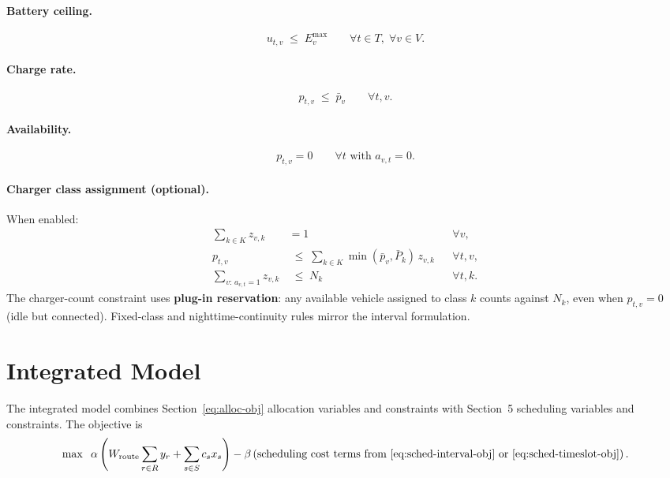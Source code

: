 \documentclass[11pt,a4paper]{article}
\newcommand{\1}{\mathbf{1}}
\begin{document}
\paragraph{Battery ceiling.}
\begin{equation}
  u_{t,v} \;\le\; E_v^{\max} \qquad \forall t \in T,\; \forall v \in V.
\end{equation}

\paragraph{Charge rate.}
\begin{equation}
  p_{t,v} \;\le\; \bar{p}_v \qquad \forall t,v.
\end{equation}

\paragraph{Availability.}
\begin{equation}
  p_{t,v} = 0 \qquad \forall t \text{ with } a_{v,t} = 0.
\end{equation}

\paragraph{Charger class assignment (optional).}
When enabled:
\begin{align}
  \sum_{k \in K} z_{v,k} &= 1 && \forall v, \\
  p_{t,v} &\;\le\; \sum_{k \in K} \min(\bar{p}_v, \bar{P}_k)\, z_{v,k} && \forall t,v, \\
  \sum_{v:\, a_{v,t}=1} z_{v,k} &\;\le\; N_k && \forall t,k.
\end{align}
The charger-count constraint uses \textbf{plug-in reservation}: any available vehicle
assigned to class $k$ counts against $N_k$, even when $p_{t,v} = 0$ (idle but connected).
Fixed-class and nighttime-continuity rules mirror the interval formulation.

\section{Integrated Model}

The integrated model combines Section~\ref{eq:alloc-obj} allocation variables and
constraints with Section~5 scheduling variables and constraints. The objective is
\begin{equation}
  \max \;\; \alpha \left( W_{\mathrm{route}} \sum_{r \in R} y_r + \sum_{s \in S} c_s x_s \right)
  - \beta \left( \text{scheduling cost terms from \eqref{eq:sched-interval-obj} or \eqref{eq:sched-timeslot-obj}} \right).
\end{equation}
\end{document}
